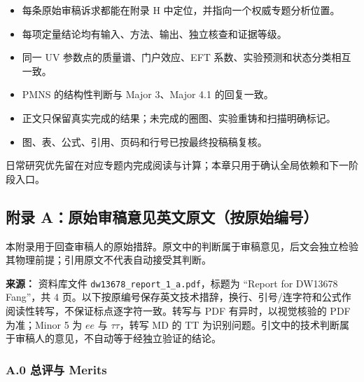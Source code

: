 \documentclass[
  chinese,
  UTF8]{ctexart}
\providecommand{\tightlist}{%
  \setlength{\itemsep}{0pt}\setlength{\parskip}{0pt}}
\begin{document}
\begin{itemize}
\tightlist
\item[$\square$]
  每条原始审稿诉求都能在附录 H 中定位，并指向一个权威专题分析位置。
\item[$\square$]
  每项定量结论均有输入、方法、输出、独立核查和证据等级。
\item[$\square$]
  同一 UV 参数点的质量谱、门户效应、EFT
  系数、实验预测和状态分类相互一致。
\item[$\square$]
  PMNS 的结构性判断与 Major 3、Major 4.1 的回复一致。
\item[$\square$]
  正文只保留真实完成的结果；未完成的圈图、实验重铸和扫描明确标记。
\item[$\square$]
  图、表、公式、引用、页码和行号已按最终投稿稿复核。
\end{itemize}

日常研究优先留在对应专题内完成阅读与计算；本章只用于确认全局依赖和下一阶段入口。

\subsection{附录
A：原始审稿意见英文原文（按原始编号）}\label{ux9644ux5f55-aux539fux59cbux5ba1ux7a3fux610fux89c1ux82f1ux6587ux539fux6587ux6309ux539fux59cbux7f16ux53f7}

本附录用于回查审稿人的原始措辞。原文中的判断属于审稿意见，后文会独立检验其物理前提；引用原文不代表自动接受其判断。

\textbf{来源：} 资料库文件 \texttt{dw13678\_report\_1\_a.pdf}，标题为
``Report for DW13678 Fang''，共 4
页。以下按原编号保存英文技术措辞，换行、引号/连字符和公式作阅读性转写，不保证标点逐字符一致。转写与
PDF 有异时，以视觉核验的 PDF 为准；Minor 5 为 \(ee\) 与
\(\tau\tau\)，转写 MD 的 TT
为识别问题。引文中的技术判断属于审稿人的意见，不自动等于经独立验证的结论。

\subsubsection{A.0 总评与 Merits}\label{a.0-ux603bux8bc4ux4e0e-merits}
\end{document}
